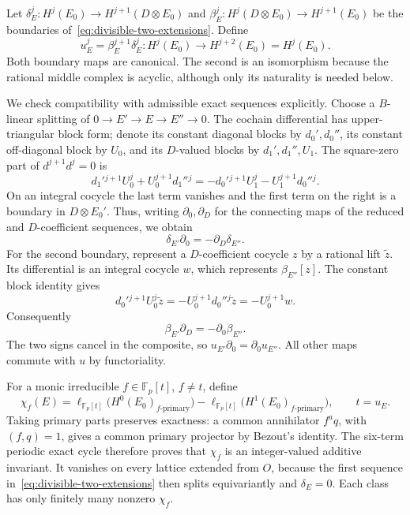 Let $\delta_E^j:H^j(E_0)\to H^{j+1}(D\otimes E_0)$ and
$\beta_E^j:H^j(D\otimes E_0)\to H^{j+1}(E_0)$ be the boundaries
of~\eqref{eq:divisible-two-extensions}.  Define
\begin{equation}\label{eq:divisible-u}
 u_E^j=\beta_E^{j+1}\delta_E^j:
 H^j(E_0)\longrightarrow H^{j+2}(E_0)=H^j(E_0).
\end{equation}
Both boundary maps are canonical.  The second is an isomorphism
because the rational middle complex is acyclic, although only its
naturality is needed below.

We check compatibility with admissible exact sequences explicitly.
Choose a $B$-linear splitting of $0\to E'\to E\to E''\to0$.
The cochain differential has upper-triangular block form; denote its
constant diagonal blocks by $d_0',d_0''$, its constant off-diagonal
block by $U_0$, and its $D$-valued blocks by $d_1',d_1'',U_1$.
The square-zero part of $d^{j+1}d^j=0$ is
\[
 d_1'{}^{j+1}U_0^j+U_0^{j+1}d_1''{}^j
 =-d_0'{}^{j+1}U_1^j-U_1^{j+1}d_0''{}^j.
\]
On an integral cocycle the last term vanishes and the first term
on the right is a boundary in $D\otimes E_0'$.  Thus, writing
$\partial_0,\partial_D$ for the connecting maps of the reduced
and $D$-coefficient sequences, we obtain
\begin{equation}\label{eq:divisible-delta-compatibility}
 \delta_{E'}\partial_0=-\partial_D\delta_{E''}.
\end{equation}
For the second boundary, represent a $D$-coefficient cocycle $z$
by a rational lift $\widetilde z$.  Its differential is an integral
cocycle $w$, which represents $\beta_{E''}[z]$.  The constant block
identity gives
\[
 d_0'{}^{j+1}U_0^j\widetilde z
 =-U_0^{j+1}d_0''{}^j\widetilde z=-U_0^{j+1}w.
\]
Consequently
\begin{equation}\label{eq:divisible-beta-compatibility}
 \beta_{E'}\partial_D=-\partial_0\beta_{E''}.
\end{equation}
The two signs cancel in the composite, so
$u_{E'}\partial_0=\partial_0u_{E''}$.  All other maps commute with
$u$ by functoriality.

For a monic irreducible $f\in\mathbb F_p[t]$, $f\ne t$, define
\begin{equation}\label{eq:divisible-euler-detector}
 \chi_f(E)=
 \ell_{\mathbb F_p[t]}\bigl(H^0(E_0)_{f\text{-primary}}\bigr)
 -\ell_{\mathbb F_p[t]}\bigl(H^1(E_0)_{f\text{-primary}}\bigr),
 \qquad t=u_E.
\end{equation}
Taking primary parts preserves exactness: a common annihilator
$f^a q$, with $(f,q)=1$, gives a common primary projector by Bezout's
identity.  The six-term periodic exact cycle therefore proves that
$\chi_f$ is an integer-valued additive invariant.  It vanishes on
every lattice extended from $O$, because the first sequence
in~\eqref{eq:divisible-two-extensions} then splits equivariantly and
$\delta_E=0$.  Each class has only finitely many nonzero $\chi_f$.

